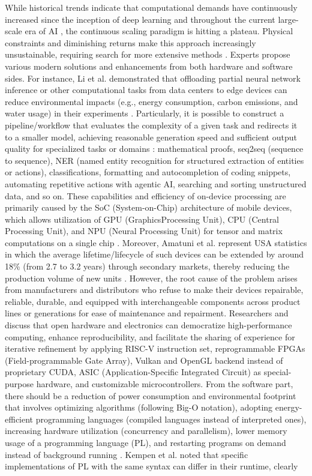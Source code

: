 While historical trends indicate that computational demands have continuously increased since the inception of deep learning and throughout the current large-scale era of AI \cite[Ch. 3]{sevilla2022compute}, the continuous scaling paradigm is hitting a plateau. Physical constraints and diminishing returns make this approach increasingly unsustainable, requiring search for more extensive methods \cite{varoquaux2025hype}. Experts propose various modern solutions and enhancements from both hardware and software sides. For instance, Li et al. demonstrated that offloading partial neural network inference or other computational tasks from data centers to edge devices can reduce environmental impacts (e.g., energy consumption, carbon emissions, and water usage) in their experiments \cite{li2025case}. Particularly, it is possible to construct a pipeline/workflow that evaluates the complexity of a given task and redirects it to a smaller model, achieving reasonable generation speed and sufficient output quality for specialized tasks or domains \cite{belcak2025small}: mathematical proofs, seq2seq (sequence to sequence), NER (named entity recognition for structured extraction of entities or actions), classifications, formatting and autocompletion of coding snippets, automating repetitive actions with agentic AI, searching and sorting unstructured data, and so on. These capabilities and efficiency of on-device processing are primarily caused by the SoC (System-on-Chip) architecture of mobile devices, which allows utilization of GPU (GraphicsProcessing Unit), CPU (Central Processing Unit), and NPU (Neural Processing Unit) for tensor and matrix computations on a single chip \cite{lee2019ondevice}. Moreover, Amatuni et al. represent USA statistics in which the average lifetime/lifecycle of such devices can be extended by around 18\% (from 2.7 to 3.2 years) through secondary markets, thereby reducing the production volume of new units \cite{amatuni2026secondhand}. However, the root cause of the problem arises from manufacturers and distributors who refuse to make their devices repairable, reliable, durable, and equipped with interchangeable components across product lines or generations for ease of maintenance and repairment. Researchers \cite{oellermann2022open} and \cite{kalapothas2023survey} discuss that open hardware and electronics can democratize high-performance computing, enhance reproducibility, and facilitate the sharing of experience for iterative refinement by applying RISC-V instruction set, reprogrammable FPGAs (Field-programmable Gate Array), Vulkan and OpenGL backend instead of proprietary CUDA, ASIC (Application-Specific Integrated Circuit) as special-purpose hardware, and customizable microcontrollers. From the software part, there should be a reduction of power consumption and environmental footprint that involves optimizing algorithms (following Big-O notation), adopting energy-efficient programming languages (compiled languages instead of interpreted ones), increasing hardware utilization (concurrency and parallelism), lower memory usage of a programming language (PL), and restarting programs on demand instead of background running \cite{pereira2017energy}. Kempen et al. noted that specific implementations of PL with the same syntax can differ in their runtime, clearly 